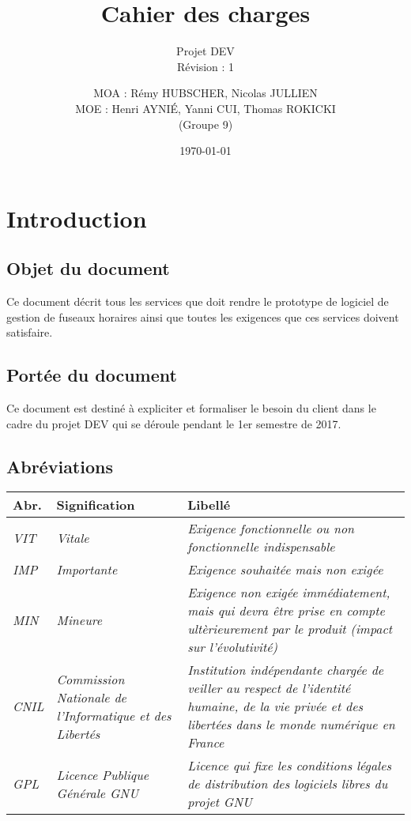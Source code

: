 \documentclass[majeure,gl]{tb}
\date{\today}
\title[Cahier des charges]{Cahier des charges}
\subtitle{Projet DEV \\ Révision : 1}
\author{MOA : Rémy HUBSCHER, Nicolas JULLIEN \\ MOE : Henri AYNIÉ, Yanni CUI, Thomas ROKICKI \\ \small(Groupe 9)}
\begin{document}
\maketitle

\clearpage
\renewcommand\contentsname{Sommaire}
\tableofcontents


\clearpage






\clearpage
\section{Introduction}

\subsection{Objet du document}
Ce document décrit tous les services que doit rendre le prototype de
logiciel de gestion de fuseaux horaires ainsi
que toutes les exigences que ces services doivent satisfaire.


\subsection{Portée du document}

Ce document est destiné à expliciter et formaliser le besoin du client
 dans le cadre du projet DEV qui se
déroule pendant le 1er semestre de 2017.



\subsection{Abréviations}
\label{sec:abreviation}

\begin{tabular}[c]{|p{1cm}|p{2.6cm}|p{12.4cm}|}
  \hline
  \textbf{Abr.} & \textbf{Signification} & \textbf{Libellé}
  \\\hline
  \textit{VIT} & \textit{Vitale} & \textit{Exigence fonctionnelle ou non fonctionnelle indispensable}
  \\\hline
  \textit{IMP} & \textit{Importante} & \textit{Exigence souhaitée mais non exigée}
  \\\hline
  \textit{MIN} & \textit{Mineure} &
  \textit{Exigence non exigée immédiatement, mais qui devra être prise en compte
    ultèrieurement par le produit (impact sur l'évolutivité)}
  \\\hline
  \textit{CNIL} & \textit{Commission Nationale de l'Informatique et des Libertés} &
  \textit{Institution indépendante chargée de veiller au respect de l'identité humaine, de la vie privée et des libertées dans le monde numérique en France}
  \\\hline
  \textit{GPL} & \textit{Licence Publique Générale GNU} &
  \textit{Licence qui fixe les conditions légales de distribution des logiciels libres du projet GNU}
  \\\hline
\end{tabular}
\end{document}
